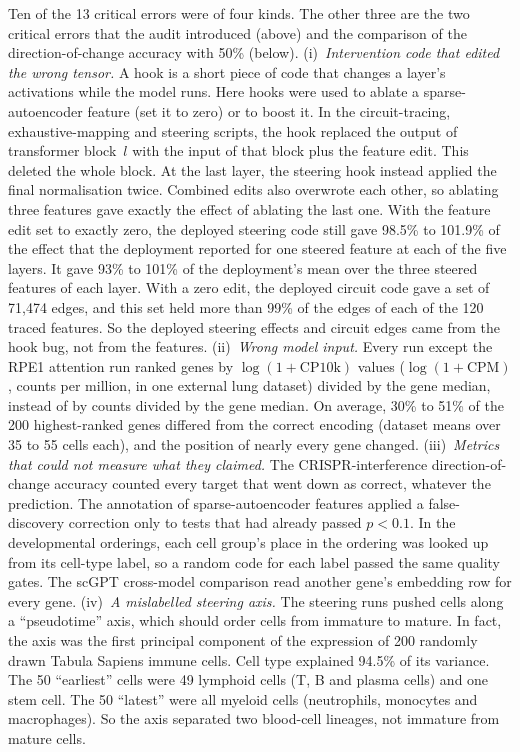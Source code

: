\documentclass[10pt,letterpaper]{article}
\begin{document}
Ten of the 13 critical errors were of four kinds. The other three are
the two critical errors that the audit introduced (above) and the
comparison of the direction-of-change accuracy with 50\% (below).
(i)~\emph{Intervention code that
edited the wrong tensor.} A hook is a short piece of code that changes a
layer's activations while the model runs. Here hooks were used to ablate
a sparse-autoencoder feature (set it to zero) or to boost it. In the
circuit-tracing, exhaustive-mapping and steering scripts, the hook
replaced the output of transformer block~$l$ with the input of that block
plus the feature edit. This deleted the whole block. At the last layer,
the steering hook instead applied the final normalisation twice.
Combined edits also overwrote each other, so ablating three features gave
exactly the effect of ablating the last one. With the feature edit set to
exactly zero, the deployed steering code still gave 98.5\% to 101.9\% of
the effect that the deployment reported for one steered feature at each
of the five layers. It gave 93\% to 101\% of the deployment's mean over
the three steered features of each layer. With a zero edit, the deployed
circuit code gave a set of 71,474 edges, and this set held more than 99\% of the edges of
each of the 120 traced features. So the deployed steering effects and
circuit edges came from the hook bug, not from the features.
(ii)~\emph{Wrong model input.} Every run except the RPE1 attention run
ranked genes by $\log(1+\text{CP10k})$ values ($\log(1+\text{CPM})$,
counts per million, in one external lung dataset) divided by the gene
median, instead of by counts divided by the gene median. On average,
30\% to 51\% of the 200 highest-ranked genes differed from the correct
encoding (dataset means over 35 to 55 cells each), and the position of
nearly every gene changed. (iii)~\emph{Metrics that could not measure
what they claimed.} The CRISPR-interference direction-of-change accuracy
counted every target that went down as correct, whatever the prediction.
The annotation of sparse-autoencoder features applied a false-discovery
correction only to tests that had already passed $p<0.1$. In the
developmental orderings, each cell group's place in the ordering was
looked up from its cell-type label, so a random code for each label
passed the same quality gates. The scGPT cross-model comparison read
another gene's embedding row for every gene. (iv)~\emph{A mislabelled
steering axis.} The steering runs pushed cells along a ``pseudotime''
axis, which should order cells from immature to mature. In fact, the
axis was the first principal component of the expression of 200 randomly
drawn Tabula Sapiens immune cells. Cell type explained 94.5\% of its
variance. The 50 ``earliest'' cells were 49 lymphoid cells (T, B and
plasma cells) and one stem cell. The 50 ``latest'' were all myeloid cells
(neutrophils, monocytes and macrophages). So the axis separated two
blood-cell lineages, not immature from mature cells.
\end{document}
